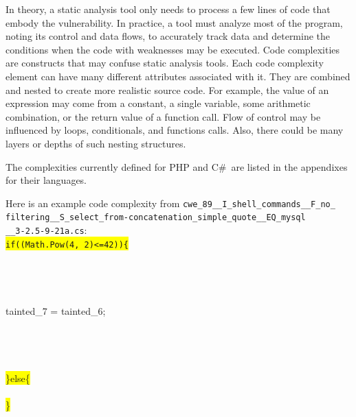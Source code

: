 \documentclass[12pt]{article}
\newcommand{\CSharp}{C{\fontseries{b}\selectfont\#}}
\begin{document}
In theory, a static analysis tool only needs to process a few lines of
code that
embody the vulnerability. In practice, a tool must analyze most 
of the program,
noting its control and data flows, to accurately track data and
determine the
conditions when the code with weaknesses may be executed.
Code complexities are constructs that may confuse static 
analysis tools.  
Each code complexity element can have many different attributes
associated with it.
They are combined and nested to create more realistic source code.
For example, the value 
of an expression may come from a constant, a single variable, 
some arithmetic 
combination, or the return value of a function call.  
Flow of control may be
influenced by loops, conditionals, and functions calls.  
Also, there could be many 
layers or depths of such nesting structures.  

The complexities currently defined for PHP
and \CSharp\ are listed in the appendixes for their languages.

Here is an example code complexity from \verb|cwe_89__I_shell_commands__F_no_|\\ 
\verb|filtering__S_select_from-concatenation_simple_quote__EQ_mysql| \\
\verb|__3-2.5-9-21a.cs|: \\
{\texttt
{\colorbox{yellow}{if((Math.Pow(4, 2)<=42))\{}}\\
\\
\\
\\
\\
\hspace*{6em}tainted\_7 = tainted\_6;\\
\\
\\
\\              
\\
{\colorbox{yellow}{\}else\{}}\\
\\
{\colorbox{yellow}{\}}}
}
\end{document}
